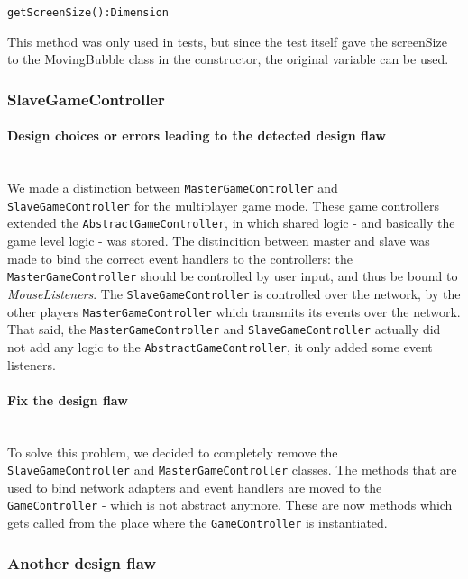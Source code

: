 \documentclass[a4paper]{article}
\begin{document}
\texttt{getScreenSize():Dimension}

This method was only used in tests, but since the test itself gave the screenSize to the MovingBubble class in the constructor, the original variable can be used.


\subsubsection{SlaveGameController}\label{SlaveGameController}
\paragraph{Design choices or errors leading to the detected design flaw}\mbox{}\\
We made a distinction between \texttt{MasterGameController} and \texttt{SlaveGameController} for the multiplayer game mode. These game controllers extended the \texttt{AbstractGameController}, in which shared logic - and basically the game level logic - was stored. The distincition between master and slave was made to bind the correct event handlers to the controllers: the \texttt{MasterGameController} should be controlled by user input, and thus be bound to \textit{MouseListeners}. The \texttt{SlaveGameController} is controlled over the network, by the other players \texttt{MasterGameController} which transmits its events over the network. That said, the \texttt{MasterGameController} and \texttt{SlaveGameController} actually did not add any logic to the \texttt{AbstractGameController}, it only added some event listeners.


\paragraph{Fix the design flaw}\mbox{}\\
To solve this problem, we decided to completely remove the \texttt{SlaveGameController} and \texttt{MasterGameController} classes. The methods that are used to bind network adapters and event handlers are moved to the \texttt{GameController} - which is not abstract anymore. These are now methods which gets called from the place where the \texttt{GameController} is instantiated.

\subsubsection{Another design flaw}\label{Statics}
\end{document}
